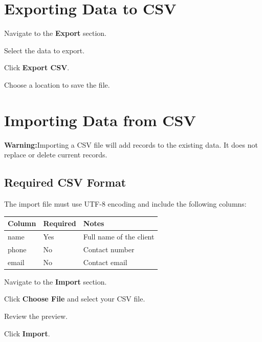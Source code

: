 \documentclass[12pt, a4paper]{report}
\newcommand{\warnbox}[1]{%
	\vspace{6pt}
	\noindent
	\colorbox{WarnYellow}{%
		\begin{minipage}{\dimexpr\linewidth-2\fboxsep}%
			\vspace{5pt}
			\small\textbf{\color{WarnBorder}Warning:\space}\color{Navy}#1
			\vspace{5pt}
		\end{minipage}%
	}
	\vspace{6pt}
}
\newcommand{\ui}[1]{\textbf{\color{Navy}#1}}
\begin{document}
	\section{Exporting Data to CSV}
	
	\begin{steps}
		\item Navigate to the \ui{Export} section.
		\item Select the data to export.
		\item Click \ui{Export CSV}.
		\item Choose a location to save the file.
	\end{steps}
	
	\section{Importing Data from CSV}
	
	\warnbox{Importing a CSV file will add records to the existing data.
		It does not replace or delete current records.}
	
	\subsection{Required CSV Format}
	
	The import file must use UTF-8 encoding and include the following columns:
	
	\begin{tabularx}{\textwidth}{l l X}
		\toprule
		\textbf{Column} & \textbf{Required} & \textbf{Notes} \\
		\midrule
		name   & Yes & Full name of the client \\
		phone  & No  & Contact number \\
		email  & No  & Contact email \\
		\bottomrule
	\end{tabularx}
	
	\begin{steps}
		\item Navigate to the \ui{Import} section.
		\item Click \ui{Choose File} and select your CSV file.
		\item Review the preview.
		\item Click \ui{Import}.
	\end{steps}
	
\end{document}

